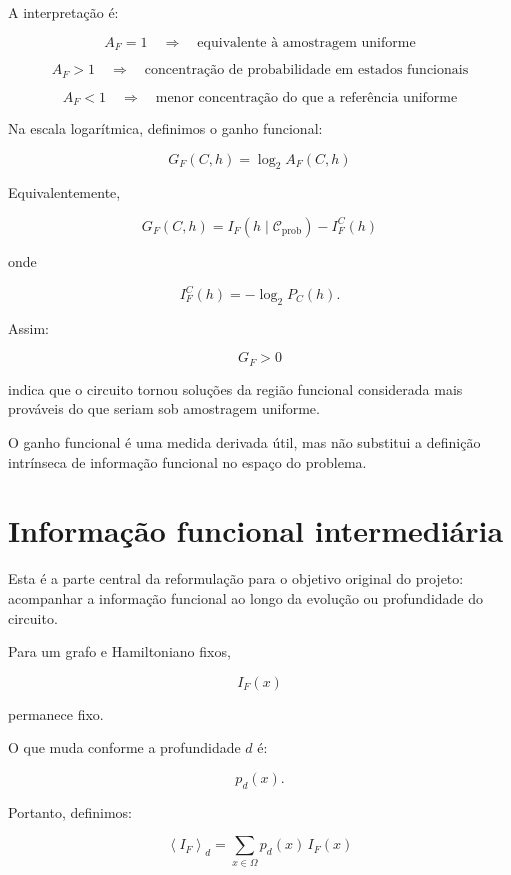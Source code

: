 \documentclass[11pt,a4paper]{article}
\begin{document}
A interpretação é:

\[
A_F=1
\quad\Rightarrow\quad
\text{equivalente à amostragem uniforme}
\]

\[
A_F>1
\quad\Rightarrow\quad
\text{concentração de probabilidade em estados funcionais}
\]

\[
A_F<1
\quad\Rightarrow\quad
\text{menor concentração do que a referência uniforme}
\]

Na escala logarítmica, definimos o ganho funcional:

\begin{proposedbox}

\[
\boxed{
G_F(C,h)
=
\log_2 A_F(C,h)
}
\]

Equivalentemente,

\[
\boxed{
G_F(C,h)
=
I_F(h\mid\mathcal C_{\mathrm{prob}})
-
I_F^C(h)
}
\]

onde

\[
I_F^C(h)
=
-\log_2 P_C(h).
\]

\end{proposedbox}

Assim:

\[
G_F>0
\]

indica que o circuito tornou soluções da região funcional considerada
mais prováveis do que seriam sob amostragem uniforme.

O ganho funcional é uma medida derivada útil, mas não substitui
a definição intrínseca de informação funcional no espaço do problema.

\section{Informação funcional intermediária}

Esta é a parte central da reformulação para o objetivo original
do projeto: acompanhar a informação funcional ao longo da
evolução ou profundidade do circuito.

Para um grafo e Hamiltoniano fixos,

\[
I_F(x)
\]

permanece fixo.

O que muda conforme a profundidade $d$ é:

\[
p_d(x).
\]

Portanto, definimos:

\begin{proposedbox}

\[
\boxed{
\left\langle I_F\right\rangle_d
=
\sum_{x\in\Omega}
p_d(x)\,I_F(x)
}
\]

\end{proposedbox}
\end{document}
